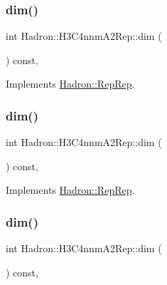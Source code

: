 \subsubsection{\texorpdfstring{dim()}{dim()}\hspace{0.1cm}{\footnotesize\ttfamily [3/5]}}
{\footnotesize\ttfamily int Hadron\+::\+H3\+C4nnm\+A2\+Rep\+::dim (\begin{DoxyParamCaption}{ }\end{DoxyParamCaption}) const\hspace{0.3cm}{\ttfamily [inline]}, {\ttfamily [virtual]}}



Implements \mbox{\hyperlink{structHadron_1_1RepRep_a92c8802e5ed7afd7da43ccfd5b7cd92b}{Hadron\+::\+Rep\+Rep}}.

\mbox{\label{structHadron_1_1H3C4nnmA2Rep_a55f662581c05e8ebbc19e6dacf250f79}} 
\subsubsection{\texorpdfstring{dim()}{dim()}\hspace{0.1cm}{\footnotesize\ttfamily [4/5]}}
{\footnotesize\ttfamily int Hadron\+::\+H3\+C4nnm\+A2\+Rep\+::dim (\begin{DoxyParamCaption}{ }\end{DoxyParamCaption}) const\hspace{0.3cm}{\ttfamily [inline]}, {\ttfamily [virtual]}}



Implements \mbox{\hyperlink{structHadron_1_1RepRep_a92c8802e5ed7afd7da43ccfd5b7cd92b}{Hadron\+::\+Rep\+Rep}}.

\mbox{\label{structHadron_1_1H3C4nnmA2Rep_a55f662581c05e8ebbc19e6dacf250f79}} 
\subsubsection{\texorpdfstring{dim()}{dim()}\hspace{0.1cm}{\footnotesize\ttfamily [5/5]}}
{\footnotesize\ttfamily int Hadron\+::\+H3\+C4nnm\+A2\+Rep\+::dim (\begin{DoxyParamCaption}{ }\end{DoxyParamCaption}) const\hspace{0.3cm}{\ttfamily [inline]}, {\ttfamily [virtual]}}



